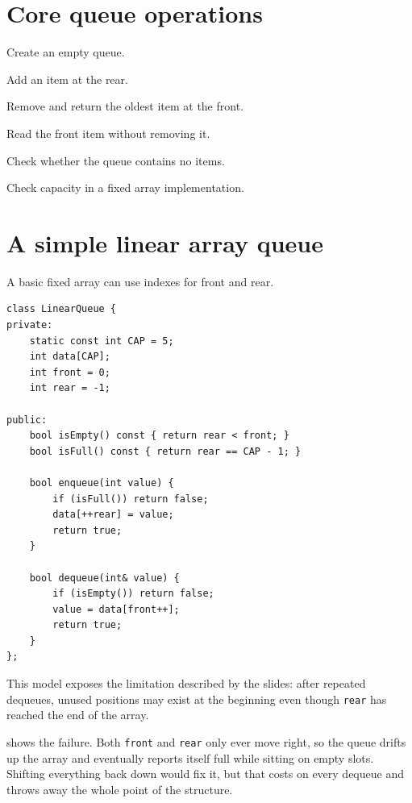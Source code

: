 \section{Core queue operations}

\begin{description}[leftmargin=1.3in,style=nextline]
  \item[Create Q] Create an empty queue.
  \item[enqueue()] Add an item at the rear.
  \item[dequeue()] Remove and return the oldest item at the front.
  \item[peek/front] Read the front item without removing it.
  \item[isEmpty()] Check whether the queue contains no items.
  \item[isFull()] Check capacity in a fixed array implementation.
\end{description}

\section{A simple linear array queue}

A basic fixed array can use indexes for front and rear.

\begin{lstlisting}
class LinearQueue {
private:
    static const int CAP = 5;
    int data[CAP];
    int front = 0;
    int rear = -1;

public:
    bool isEmpty() const { return rear < front; }
    bool isFull() const { return rear == CAP - 1; }

    bool enqueue(int value) {
        if (isFull()) return false;
        data[++rear] = value;
        return true;
    }

    bool dequeue(int& value) {
        if (isEmpty()) return false;
        value = data[front++];
        return true;
    }
};
\end{lstlisting}

This model exposes the limitation described by the slides: after repeated dequeues, unused positions may exist at the beginning even though \texttt{rear} has reached the end of the array.

 shows the failure. Both \texttt{front} and \texttt{rear} only
ever move right, so the queue drifts up the array and eventually reports itself full while
sitting on empty slots. Shifting everything back down would fix it, but that costs
 on every dequeue and throws away the whole point of the structure.


